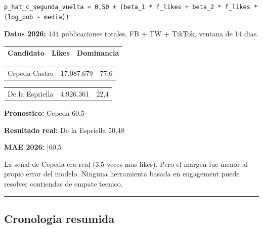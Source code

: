 \documentclass[11pt,a4paper]{article}
\begin{document}
{{\begin{lstlisting}
p_hat_c_segunda_vuelta = 0,50 + (beta_1 * f_likes + beta_2 * f_likes * (log_pob - media))
\end{lstlisting}

\textbf{Datos 2026:} 444 publicaciones totales, FB + TW + TikTok, ventana de 14 dias.\\[2pt]

\begin{center}
\begin{tabular}{lll}
\hline
Candidato & Likes & Dominancia \\
\hline
\end{tabular}
\end{center}
\begin{center}
\begin{tabular}{lll}
\hline
Cepeda Castro & 17.087.679 & 77,6%
\hline
\end{tabular}
\end{center}
\begin{center}
\begin{tabular}{lll}
\hline
De la Espriella & 4.926.361 & 22,4%
\hline
\end{tabular}
\end{center}

\textbf{Pronostico:} Cepeda 60,5%

\textbf{Resultado real:} De la Espriella 50,48%

\textbf{MAE 2026:} |60,5%

La senal de Cepeda era real (3,5 veces mas likes). Pero el margen fue menor al propio error del modelo. Ninguna herramienta basada en engagement puede resolver contiendas de empate tecnico.\\[2pt]

\vspace{4pt}\noindent\rule{\linewidth}{0.4pt}\vspace{4pt}

\subsection{Cronologia resumida}

}}
\end{document}
